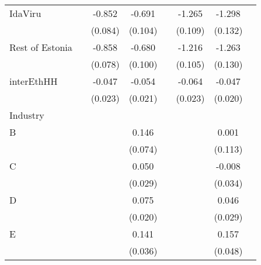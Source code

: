 {\begin{longtable}{l*{3}{c}|l*{3}{c}}
		IdaViru           &                     &      -0.852\sym{***}&      -0.691\sym{***}&                     &      -1.265\sym{***}&      -1.298\sym{***}\\
		&                     &     (0.084)         &     (0.104)         &                     &     (0.109)         &     (0.132)         \\
		Rest of Estonia&                     &      -0.858\sym{***}&      -0.680\sym{***}&                     &      -1.216\sym{***}&      -1.263\sym{***}\\
		&                     &     (0.078)         &     (0.100)         &                     &     (0.105)         &     (0.130)         \\
		interEthHH        &                     &      -0.047\sym{*}  &      -0.054\sym{*}  &                     &      -0.064\sym{**} &      -0.047\sym{*}  \\
		&                     &     (0.023)         &     (0.021)         &                     &     (0.023)         &     (0.020)         \\
		Industry &&&&&\\
		B                   &                     &                     &       0.146\sym{*}  &                     &                     &       0.001         \\
		&                     &                     &     (0.074)         &                     &                     &     (0.113)         \\
		C                   &                     &                     &       0.050         &                     &                     &      -0.008         \\
		&                     &                     &     (0.029)         &                     &                     &     (0.034)         \\
		D                   &                     &                     &       0.075\sym{***}&                     &                     &       0.046         \\
		&                     &                     &     (0.020)         &                     &                     &     (0.029)         \\
		E                   &                     &                     &       0.141\sym{***}&                     &                     &       0.157\sym{**} \\
		&                     &                     &     (0.036)         &                     &                     &     (0.048)         \\

\end{longtable}}
